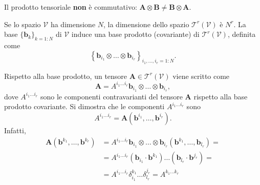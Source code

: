  \noindent
 \begin{remark}
 Il prodotto tensoriale \textbf{non} è commutativo: $\bm{A} \otimes \bm{B} \neq \bm{B} \otimes \bm{A}$.
 \end{remark}

 
\begin{definition} Se lo spazio $\mathcal{V}$
 ha dimensione $N$, la dimensione dello spazio $\mathcal{T}^r(\mathcal{V})$ è $N^r$.
 La base $\{ \bm{b}_k \}_{k=1:N}$ di $\mathcal{V}$
 induce una base prodotto (covariante) di $\mathcal{T}^r(\mathcal{V})$, definita come
\begin{equation}
  \left\{ \bm{b}_{i_1} \otimes \dots \otimes \bm{b}_{i_r} \right\}_{
  i_1,\dots,i_r = 1 : N} .
\end{equation}
\end{definition}
%
\noindent
 Rispetto alla base prodotto, un tensore $\bm{A} \in \mathcal{T}^r(\mathcal{V})$ viene scritto come
 \begin{equation}
  \bm{A} = A^{i_1 \dots i_r} \bm{b}_{i_1} \otimes \dots \otimes \bm{b}_{i_r} ,
 \end{equation}
 dove $A^{i_1 \dots i_r}$ sono le componenti contravarianti del tensore $\bm{A}$ rispetto alla base prodotto covariante.
 Si dimostra che le componenti $A^{i_1 \dots i_r}$ sono
 \begin{equation}
   A^{i_1 \dots i_r} = \bm{A}(\bm{b}^{i_1},\dots,\bm{b}^{i_r}) .
 \end{equation}
 Infatti,
 \begin{equation}
 \begin{aligned}
   \bm{A}(\bm{b}^{k_1},\dots,\bm{b}^{k_r}) & =
     A^{i_1 \dots i_r} \bm{b}_{i_1} \otimes \dots \otimes \bm{b}_{i_r} ( \bm{b}^{k_1}, \dots, \bm{b}_{l_r})  = \\ & =
     A^{i_1 \dots i_r} ( \bm{b}_{i_1} \cdot \bm{b}^{k_1} ) \dots (\bm{b}_{l_r} \cdot \bm{b}^{j_r} )  = \\
     & = A^{i_1 \dots i_r} \delta^{k_1}_{i_1} \dots \delta^{j_r}_{l_r} = A^{k_1 \dots k_r}
 \end{aligned}
 \end{equation}

